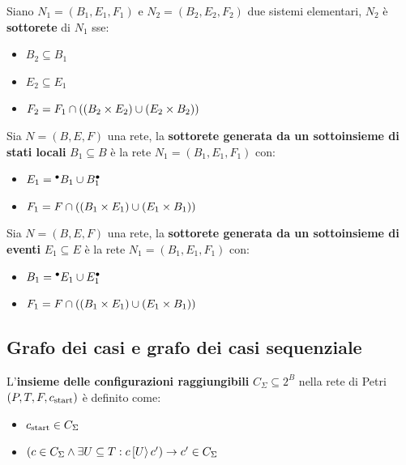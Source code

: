 \begin{defn}
    Siano $N_1 = (B_1, E_1, F_1)$ e $N_2 = (B_2, E_2, F_2)$ due sistemi
    elementari, $N_2$ è \textbf{sottorete} di $N_1$ sse:
    \begin{itemize}
        \item $B_2 \subseteq B_1$
        \item $E_2 \subseteq E_1$
        \item $F_2 = F_1 \cap \left(\left(B_2 \times E_2\right) \cup \left(E_2 \times B_2\right)\right)$
    \end{itemize}
\end{defn}

\begin{defn}
    Sia $N = (B, E, F)$ una rete, la \textbf{sottorete generata da
    un sottoinsieme di stati locali} $B_1 \subseteq B$ è la rete
    $N_1 = (B_1, E_1, F_1)$ con:
    \begin{itemize}
        \item $E_1 = {^\bullet}B_1 \cup B_1^\bullet$
        \item $F_1 = F \cap\left(\left(B_1 \times E_1\right) \cup \left(E_1 \times B_1\right)\right)$
    \end{itemize}
\end{defn}

\begin{defn}
    Sia $N = (B, E, F)$ una rete, la \textbf{sottorete generata da un
    sottoinsieme di eventi} $E_1 \subseteq E$ è la rete
    $N_1 = (B_1, E_1, F_1)$ con:
    \begin{itemize}
        \item $B_1 = {^\bullet}E_1 \cup E_1^\bullet$
        \item
        $F_1 = F \cap \left(\left(B_1 \times E_1\right) \cup \left(E_1 \times B_1\right)\right)$
    \end{itemize}
\end{defn}

\subsection*{Grafo dei casi e grafo dei casi sequenziale}
\begin{defn}
    L'\textbf{insieme delle configurazioni raggiungibili}
    $C_{\Sigma} \subseteq 2^{B}$ nella rete di Petri $(P, T, F, c_{\textnormal{start}})$
    è definito come:
    \begin{itemize}
        \item $c_{\textnormal{start}} \in C_{\Sigma}$
        \item $\left(c \in C_{\Sigma} \land \exists U \subseteq T :
        c\,[U\rangle\,c'\right) \rightarrow c' \in C_{\Sigma}$
    \end{itemize}
\end{defn}

